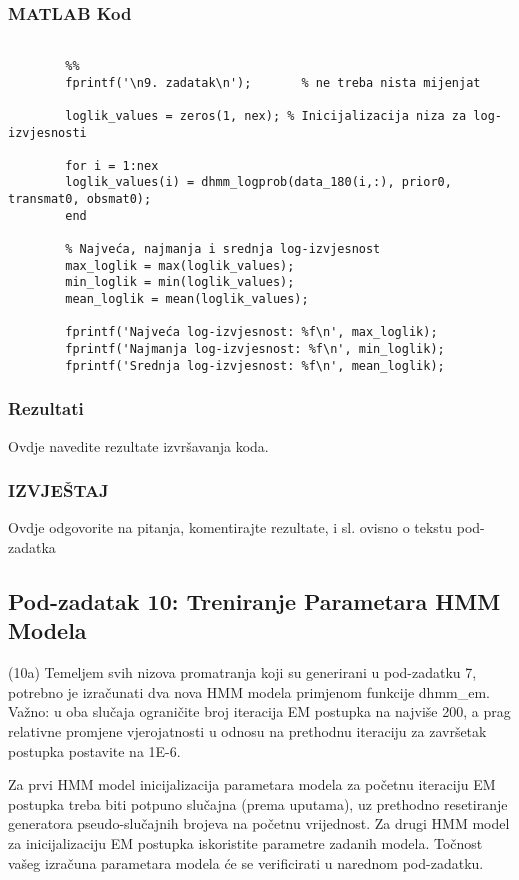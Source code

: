 \documentclass[12pt]{article}
\begin{document}
	\subsubsection*{MATLAB Kod}
	\begin{lstlisting}
		
		%%
		fprintf('\n9. zadatak\n');       % ne treba nista mijenjat
		
		loglik_values = zeros(1, nex); % Inicijalizacija niza za log-izvjesnosti
		
		for i = 1:nex
		loglik_values(i) = dhmm_logprob(data_180(i,:), prior0, transmat0, obsmat0);
		end
		
		% Najveća, najmanja i srednja log-izvjesnost
		max_loglik = max(loglik_values);
		min_loglik = min(loglik_values);
		mean_loglik = mean(loglik_values);
		
		fprintf('Najveća log-izvjesnost: %f\n', max_loglik);
		fprintf('Najmanja log-izvjesnost: %f\n', min_loglik);
		fprintf('Srednja log-izvjesnost: %f\n', mean_loglik);
	\end{lstlisting}
	
	\subsubsection*{Rezultati}
	Ovdje navedite rezultate izvršavanja koda.
	
	\subsubsection*{IZVJEŠTAJ}
	Ovdje odgovorite na pitanja, komentirajte rezultate, i sl. ovisno o tekstu pod-zadatka
	
	\subsection{Pod-zadatak 10: Treniranje Parametara HMM Modela}
	(10a) Temeljem svih nizova promatranja koji su generirani u pod-zadatku 7, potrebno je izračunati dva nova HMM modela primjenom funkcije dhmm\_em. Važno: u oba slučaja ograničite broj iteracija EM postupka na najviše 200, a prag relativne promjene vjerojatnosti u odnosu na prethodnu iteraciju za završetak postupka postavite na 1E-6.
	
	Za prvi HMM model inicijalizacija parametara modela za početnu iteraciju EM postupka treba biti potpuno slučajna (prema uputama), uz prethodno resetiranje generatora pseudo-slučajnih brojeva na početnu vrijednost. Za drugi HMM model za inicijalizaciju EM postupka iskoristite parametre zadanih modela. Točnost vašeg izračuna parametara modela će se verificirati u narednom pod-zadatku.
	
\end{document}
